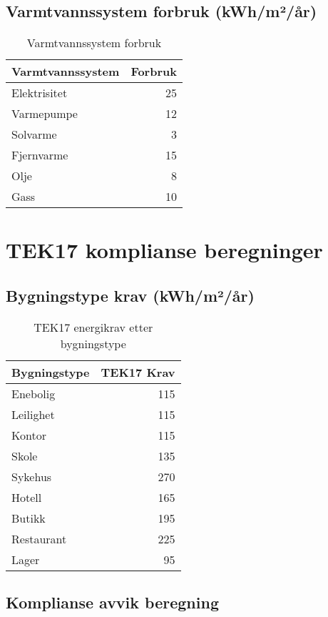 \documentclass[12pt,a4paper]{article}
\begin{document}
\subsection{Varmtvannssystem forbruk (kWh/m²/år)}

\begin{table}[H]
\centering
\begin{tabular}{|l|r|}
\hline
\textbf{Varmtvannssystem} & \textbf{Forbruk} \\
\hline
Elektrisitet & 25 \\
Varmepumpe & 12 \\
Solvarme & 3 \\
Fjernvarme & 15 \\
Olje & 8 \\
Gass & 10 \\
\hline
\end{tabular}
\caption{Varmtvannssystem forbruk}
\end{table}

\section{TEK17 komplianse beregninger}

\subsection{Bygningstype krav (kWh/m²/år)}

\begin{table}[H]
\centering
\begin{tabular}{|l|r|}
\hline
\textbf{Bygningstype} & \textbf{TEK17 Krav} \\
\hline
Enebolig & 115 \\
Leilighet & 115 \\
Kontor & 115 \\
Skole & 135 \\
Sykehus & 270 \\
Hotell & 165 \\
Butikk & 195 \\
Restaurant & 225 \\
Lager & 95 \\
\hline
\end{tabular}
\caption{TEK17 energikrav etter bygningstype}
\end{table}

\subsection{Komplianse avvik beregning}
\end{document}
